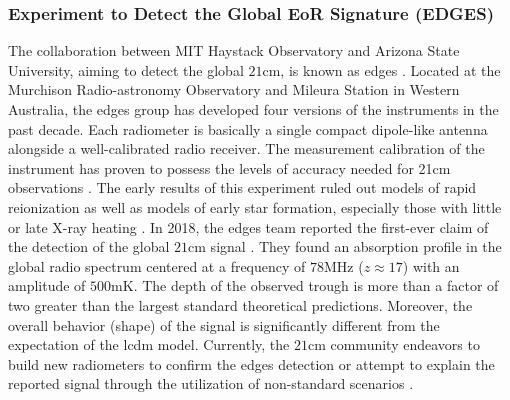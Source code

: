 \documentclass[12pt, TexShade, letterpaper]{report}
\begin{document}
\subsubsection{Experiment to Detect the Global EoR Signature (EDGES)}
The collaboration between MIT Haystack Observatory and Arizona State University, aiming to detect the global $\mathrm{21cm}$, is known as \gls{edges} \cite{edges_website_1, edges_website_2}. Located at the Murchison Radio-astronomy Observatory and Mileura Station in Western Australia, the \gls{edges} group has developed four versions of the instruments in the past decade. Each radiometer is basically a single compact dipole-like antenna alongside a well-calibrated radio receiver. The measurement calibration of the instrument has proven to possess the levels of accuracy needed for 21cm observations \cite{edges_calibration_1, edges_calibration_2}. The early results of this experiment ruled out models of rapid reionization as well as models of early star formation, especially those with little or late X-ray heating \cite{edges_lower_limit, edges_high_band_constrain}. In 2018, the \gls{edges} team reported the first-ever claim of the detection of the global $\mathrm{21cm}$ signal \cite{edges}. They found an absorption profile in the global radio spectrum centered at a frequency of $\mathrm{78 MHz}$ ($z\approx 17$) with an amplitude of $\mathrm{500mK}$. The depth of the observed trough is more than a factor of two greater than the largest standard theoretical predictions. Moreover, the overall behavior (shape) of the signal is significantly different from the expectation of the \gls{lcdm} model. Currently, the $\mathrm{21cm}$ community endeavors to build new radiometers to confirm the \gls{edges} detection or attempt to explain the reported signal through the utilization of non-standard scenarios \cite{dark_ages_space, thesis_shedding, edges_toward_emprical}.\par
\end{document}
